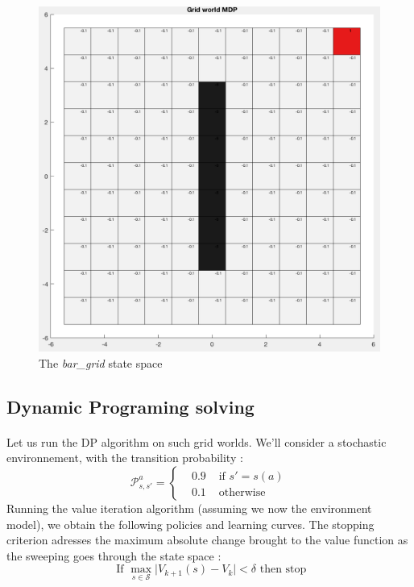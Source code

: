 \documentclass[a4paper]{report}
\begin{document}
{{\begin{figure}[h!]
\begin{minipage}{0.45\linewidth}
					\includegraphics[width=\linewidth]{bar_grid}
					\caption{The \emph{bar\_grid} state space}
				\end{minipage}
			\end{figure}
			\subsection{Dynamic Programing solving}
			{
				\paragraph{} Let us run the DP algorithm on such grid worlds. We'll consider a stochastic environnement, with the transition probability : 
				\begin{equation}
					\mathcal{P}_{s,s'}^a = \left\{\begin{aligned} &0.9 &\text{ if }s' = s(a) \\ &0.1 &\text{ otherwise} \end{aligned}\right.
				\end{equation}
				Running the value iteration algorithm (assuming we now the environment model), we obtain the following policies and learning curves. The stopping criterion adresses the maximum absolute change brought to the value function as the sweeping goes through the state space : 
				\begin{equation}
					\text{ If } \max_{s\in\mathcal{S}} \vert V_{k+1}(s) - V_k \vert < \delta \text{ then stop}
				\end{equation}
				
}}}
\end{document}
